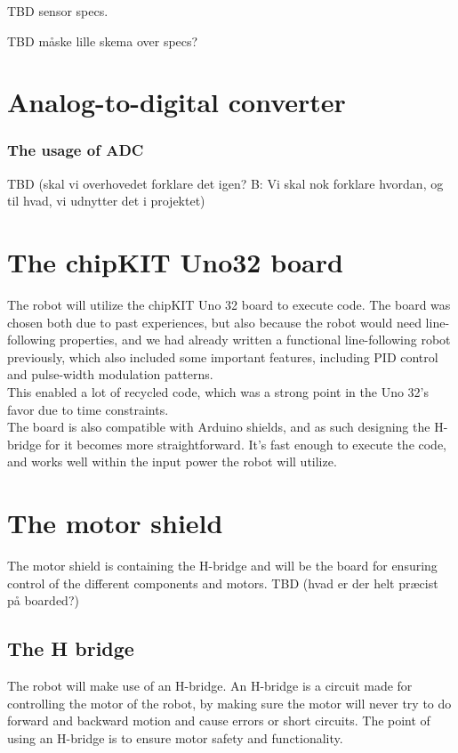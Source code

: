 TBD sensor specs.\

TBD måske lille skema over specs?

\section{Analog-to-digital converter}





\subsubsection{The usage of ADC}
TBD (skal vi overhovedet forklare det igen? B: Vi skal nok forklare hvordan, og til hvad, vi udnytter det i projektet)

\section{The chipKIT Uno32 board}
The robot will utilize the chipKIT Uno 32 board to execute code. The board
was chosen both due to past experiences, but also because the robot would need
line-following properties, and we had already written a functional line-following robot
previously, which also included some important features, including PID control and 
pulse-width modulation patterns. \\
This enabled a lot of recycled code, which was a strong point
in the Uno 32's favor due to time constraints. \\

The board is also compatible with Arduino shields, and as such designing the H-bridge for it
becomes more straightforward. It's fast enough to execute the code, and works well within the
input power the robot will utilize.

\section{The motor shield}
The motor shield is containing the H-bridge and will be the board for ensuring control of the different components and motors.
TBD (hvad er der helt præcist på boarded?)

\subsection{The H bridge}
The robot will make use of an H-bridge. An H-bridge is a circuit made for controlling the motor of the robot, by making sure the motor will never try to do forward and backward motion  and cause errors or short circuits. The point of using an H-bridge is to ensure motor safety and functionality.

